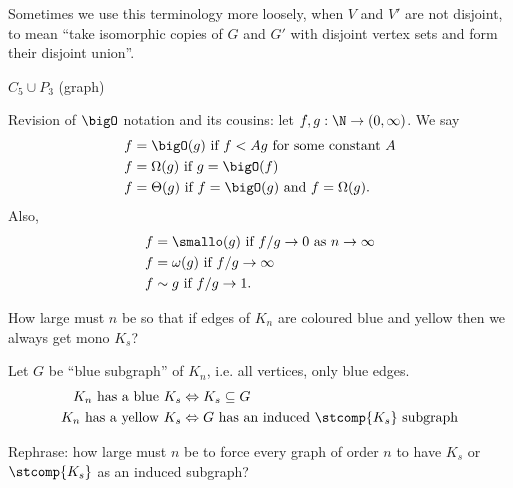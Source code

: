 \documentclass[a4paper]{article}
\newcommand*{\Omg}{\Omega}
\newcommand*{\bigT}{\Theta}
\newcommand*{\smallomg}{\omega}
\begin{document}
Sometimes we use this terminology more loosely, when \(V\) and \(V'\) are not disjoint, to mean ``take isomorphic copies of \(G\) and \(G'\) with disjoint vertex sets and form their disjoint union''.

\begin{eg}
  \(C_5 \cup P_3\) (graph)
  \iffalse
  \begin{tikzpicture}
    \Vertices{circle}{1, 2, 3, 4, 5, 6, 7, 8, 9}
    \Edges(1, 2, 3, 4, 5, 1)
    \Edges(6, 7, 8, 9)
  \end{tikzpicture}
  \fi
\end{eg}









\iffalse

Revision of \(\bigO\) notation and its cousins: let \(f,g:\N\to (0,\infty)\). We say
\begin{align*}
  f &= \bigO(g) \text{ if } f< Ag \text{ for some constant } A \\
  f &= \Omg(g) \text{ if } g=\bigO(f) \\
  f &= \bigT(g) \text{ if } f=\bigO(g) \text{ and } f = \Omg(g).
\end{align*}
Also,
\begin{align*}
  f &= \smallo(g) \text{ if } f/g\to 0 \text{ as } n\to \infty \\
  f &= \smallomg(g) \text{ if } f/g\to \infty \\
  f &\sim g \text{ if } f/g\to 1.
\end{align*}



\begin{question}
  How large must \(n\) be so that if edges of \(K_n\) are coloured blue and yellow then we always get mono \(K_s\)?
\end{question}

Let \(G\) be ``blue subgraph'' of \(K_n\), i.e. all vertices, only blue edges.
\begin{align*}
  K_n \text{ has a blue } K_s &\Leftrightarrow K_s \subseteq G \\
  K_n \text{ has a yellow } K_s &\Leftrightarrow G \text{ has an induced } \stcomp{K_s} \text{ subgraph}
\end{align*}

Rephrase: how large must \(n\) be to force every graph of order \(n\) to have \(K_s\) or \(\stcomp{K_s}\) as an induced subgraph?
\end{document}
